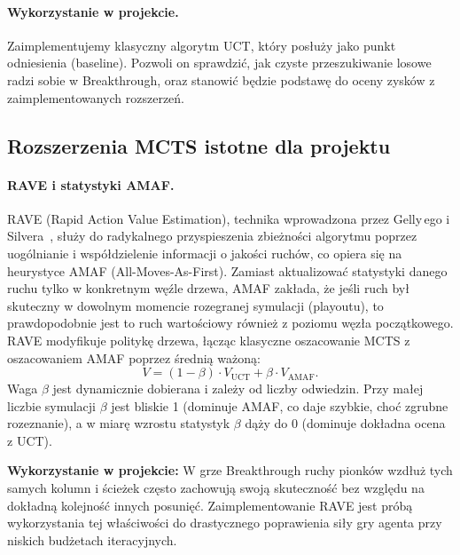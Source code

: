\paragraph{Wykorzystanie w projekcie.}
Zaimplementujemy klasyczny algorytm UCT, który posłuży jako punkt odniesienia
(baseline). Pozwoli on sprawdzić, jak czyste przeszukiwanie losowe radzi sobie
w Breakthrough, oraz stanowić będzie podstawę do oceny zysków z zaimplementowanych
rozszerzeń.

\subsection{Rozszerzenia MCTS istotne dla projektu}

\paragraph{RAVE i statystyki AMAF.}
RAVE (Rapid Action Value Estimation), technika wprowadzona przez Gelly\,ego
i Silvera~\cite{gelly2011monte}, służy do radykalnego przyspieszenia zbieżności
algorytmu poprzez uogólnianie i współdzielenie informacji o jakości ruchów,
co opiera się na heurystyce AMAF (All-Moves-As-First). Zamiast aktualizować
statystyki danego ruchu tylko w konkretnym węźle drzewa, AMAF zakłada, że jeśli
ruch był skuteczny w dowolnym momencie rozegranej symulacji (playoutu), to
prawdopodobnie jest to ruch wartościowy również z poziomu węzła początkowego.
RAVE modyfikuje politykę drzewa, łącząc klasyczne oszacowanie MCTS z oszacowaniem
AMAF poprzez średnią ważoną:
\begin{equation}
    V = (1 - \beta) \cdot V_{\text{UCT}} + \beta \cdot V_{\text{AMAF}}.
\end{equation}
Waga $\beta$ jest dynamicznie dobierana i zależy od liczby odwiedzin. Przy małej
liczbie symulacji $\beta$ jest bliskie 1 (dominuje AMAF, co daje szybkie, choć
zgrubne rozeznanie), a w miarę wzrostu statystyk $\beta$ dąży do 0 (dominuje
dokładna ocena z UCT).

\textbf{Wykorzystanie w projekcie:} W grze Breakthrough ruchy pionków wzdłuż
tych samych kolumn i ścieżek często zachowują swoją skuteczność bez względu na
dokładną kolejność innych posunięć. Zaimplementowanie RAVE jest próbą
wykorzystania tej właściwości do drastycznego poprawienia siły gry agenta przy
niskich budżetach iteracyjnych.

